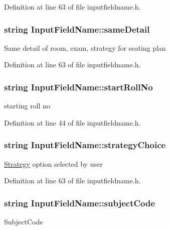 \-Definition at line 63 of file inputfieldname.\-h.

\hypertarget{classInputFieldName_a6de91205e7eac3168e17d100ab4d8e64}{
\subsubsection[{same\-Detail}]{\setlength{\rightskip}{0pt plus 5cm}string {\bf \-Input\-Field\-Name\-::same\-Detail}}}\label{dd/db2/classInputFieldName_a6de91205e7eac3168e17d100ab4d8e64}
\-Same detail of room, exam, strategy for seating plan 

\-Definition at line 63 of file inputfieldname.\-h.

\hypertarget{classInputFieldName_a24baf5c915b4ee0fb8678e03adec043a}{
\subsubsection[{start\-Roll\-No}]{\setlength{\rightskip}{0pt plus 5cm}string {\bf \-Input\-Field\-Name\-::start\-Roll\-No}}}\label{dd/db2/classInputFieldName_a24baf5c915b4ee0fb8678e03adec043a}
starting roll no 

\-Definition at line 44 of file inputfieldname.\-h.

\hypertarget{classInputFieldName_a9a6b827d404cb279cc0ed836c069e4a9}{
\subsubsection[{strategy\-Choice}]{\setlength{\rightskip}{0pt plus 5cm}string {\bf \-Input\-Field\-Name\-::strategy\-Choice}}}\label{dd/db2/classInputFieldName_a9a6b827d404cb279cc0ed836c069e4a9}
\hyperlink{classStrategy}{\-Strategy} option selected by user 

\-Definition at line 63 of file inputfieldname.\-h.

\hypertarget{classInputFieldName_af1cc6871c33344c365e6e25ea482bd48}{
\subsubsection[{subject\-Code}]{\setlength{\rightskip}{0pt plus 5cm}string {\bf \-Input\-Field\-Name\-::subject\-Code}}}\label{dd/db2/classInputFieldName_af1cc6871c33344c365e6e25ea482bd48}
\-Subject\-Code 

